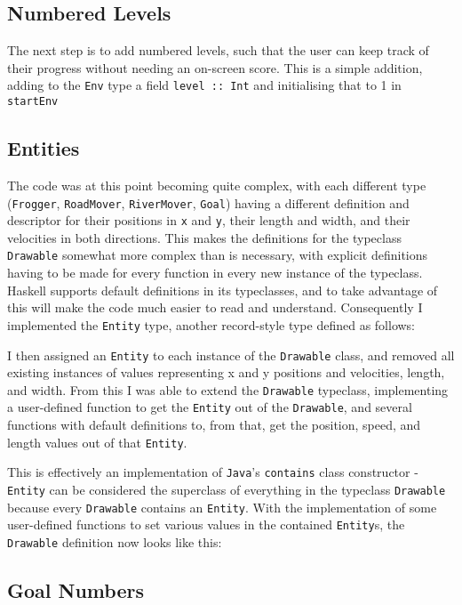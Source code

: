 \documentclass[12pt, a4paper]{report}
\begin{document}
\subsection{Numbered Levels}

The next step is to add numbered levels, such that the user can keep track of their progress without needing an on-screen score.
This is a simple addition, adding to the \verb|Env| type a field \verb|level :: Int| and initialising that to 1 in \verb|startEnv|

\subsection{Entities}

The code was at this point becoming quite complex, with each different type (\verb|Frogger|, \verb|RoadMover|, \verb|RiverMover|, \verb|Goal|) having a different definition and descriptor for their positions in \verb|x| and \verb|y|, their length and width, and their velocities in both directions.
This makes the definitions for the typeclass \verb|Drawable| somewhat more complex than is necessary, with explicit definitions having to be made for every function in every new instance of the typeclass.
Haskell supports default definitions in its typeclasses, and to take advantage of this will make the code much easier to read and understand.
Consequently I implemented the \verb|Entity| type, another record-style type defined as follows:

I then assigned an \verb|Entity| to each instance of the \verb|Drawable| class, and removed all existing instances of values representing x and y positions and velocities, length, and width.
From this I was able to extend the \verb|Drawable| typeclass, implementing a user-defined function to get the \verb|Entity| out of the \verb|Drawable|, and several functions with default definitions to, from that, get the position, speed, and length values out of that \verb|Entity|.

\par

This is effectively an implementation of \verb|Java|'s \verb|contains| class constructor - \verb|Entity| can be considered the superclass of everything in the typeclass \verb|Drawable| because every \verb|Drawable| contains an \verb|Entity|.
With the implementation of some user-defined functions to set various values in the contained \verb|Entity|s, the \verb|Drawable| definition now looks like this:

\subsection{Goal Numbers}
\end{document}
